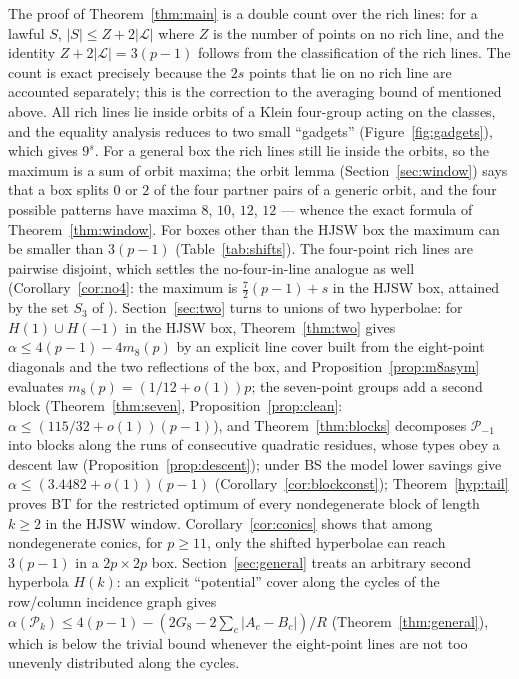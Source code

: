\documentclass[11pt]{article}
\theoremstyle{remark}
\newcommand{\Lc}{\mathcal{L}}
\newcommand{\Pset}{\mathcal{P}}
\begin{document}
The proof of Theorem~\ref{thm:main} is a double count over the rich lines: for a lawful $S$, $|S|\le Z+2|\Lc|$ where $Z$ is
the number of points on no rich line, and the identity $Z+2|\Lc|=3(p-1)$ follows from the classification of the rich lines.  The count is
exact precisely because the $2s$ points that lie on no rich line are accounted separately; this is the correction to
the averaging bound of \cite{KNS25} mentioned above.  All rich lines lie inside orbits of a Klein four-group acting on
the classes, and the equality analysis reduces to two small ``gadgets'' (Figure~\ref{fig:gadgets}), which gives $9^s$.
For a general box the rich lines still lie inside the orbits, so the maximum is a sum of orbit maxima; the orbit lemma
(Section~\ref{sec:window}) says that a box splits $0$ or $2$ of the four partner pairs of a generic orbit, and the four
possible patterns have maxima $8$, $10$, $12$, $12$ --- whence the exact formula of Theorem~\ref{thm:window}.  For boxes
other than the HJSW box the maximum can be smaller than $3(p-1)$ (Table~\ref{tab:shifts}).
The four-point rich lines are pairwise disjoint, which settles the no-four-in-line analogue as well
(Corollary~\ref{cor:no4}: the maximum is $\tfrac72(p-1)+s$ in the HJSW box, attained by the set $S_3$ of \cite{KNS25}).
Section~\ref{sec:two} turns to unions of two hyperbolae: for $H(1)\cup H(-1)$ in the HJSW box, Theorem~\ref{thm:two} gives
$\alpha\le4(p-1)-4m_8(p)$ by an explicit line cover built from the eight-point diagonals and the two reflections of the box, and
Proposition~\ref{prop:m8asym} evaluates $m_8(p)=(1/12+o(1))p$; the seven-point groups add a second block
(Theorem~\ref{thm:seven}, Proposition~\ref{prop:clean}: $\alpha\le(115/32+o(1))(p-1)$), and Theorem~\ref{thm:blocks} decomposes
$\Pset_{-1}$ into blocks along the runs of consecutive quadratic residues, whose types obey a descent law
(Proposition~\ref{prop:descent}); under BS the model lower savings give $\alpha\le(3.4482+o(1))(p-1)$ (Corollary~\ref{cor:blockconst});
Theorem~\ref{hyp:tail} proves BT for the restricted optimum of every nondegenerate block of length $k\ge2$ in the HJSW window.
Corollary~\ref{cor:conics} shows that among nondegenerate conics, for $p\ge11$, only the shifted
hyperbolae can reach $3(p-1)$ in a $2p\times2p$ box.  Section~\ref{sec:general} treats an arbitrary second hyperbola $H(k)$: an explicit
``potential'' cover along the cycles of the row/column incidence graph gives $\alpha(\Pset_k)\le4(p-1)-(2G_8-2\sum_c|A_c-B_c|)/R$
(Theorem~\ref{thm:general}), which is below the trivial bound whenever the eight-point lines are not too unevenly distributed along the cycles.
\end{document}
